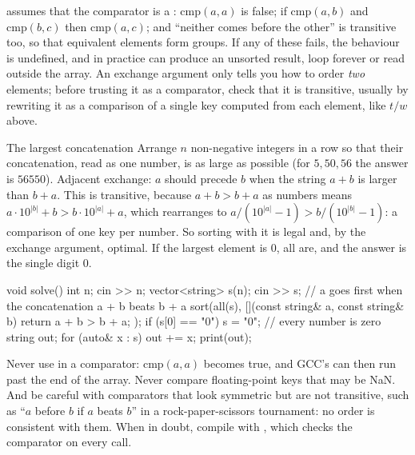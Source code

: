  assumes that the comparator is a : $\mathrm{cmp}(a, a)$ is false; if $\mathrm{cmp}(a,
b)$ and $\mathrm{cmp}(b, c)$ then $\mathrm{cmp}(a, c)$; and ``neither comes before the other'' is transitive too, so that
equivalent elements form groups. If any of these fails, the behaviour is undefined, and in practice  can produce an
unsorted result, loop forever or read outside the array. An exchange argument only tells you how to order \emph{two}
elements; before trusting it as a comparator, check that it is transitive, usually by rewriting it as a comparison of a single
key computed from each element, like $t/w$ above.

\begin{problem}{The largest concatenation}
Arrange $n$ non-negative integers in a row so that their concatenation, read as one number, is as large as possible (for
$5, 50, 56$ the answer is $56550$).
\solution Adjacent exchange: $a$ should precede $b$ when the string $a + b$ is larger than $b + a$. This is transitive,
because $a + b > b + a$ as numbers means $a \cdot 10^{|b|} + b > b \cdot 10^{|a|} + a$, which rearranges to
$a / (10^{|a|} - 1) > b / (10^{|b|} - 1)$: a comparison of one key per number. So sorting with it is legal and, by the
exchange argument, optimal. If the largest element is 0, all are, and the answer is the single digit 0.
\end{problem}

\begin{code}
void solve() {
    int n;
    cin >> n;
    vector<string> s(n);
    cin >> s;
    // a goes first when the concatenation a + b beats b + a
    sort(all(s), [](const string& a, const string& b) {
        return a + b > b + a;
    });
    if (s[0] == "0") s = {"0"};  // every number is zero
    string out;
    for (auto& x : s) out += x;
    print(out);
}
\end{code}

\begin{pitfall}
Never use \cc{<=} in a comparator: $\mathrm{cmp}(a, a)$ becomes true, and GCC's  can then run past the end of the
array. Never compare floating-point keys that may be NaN. And be careful with comparators that look symmetric but are not
transitive, such as ``$a$ before $b$ if $a$ beats $b$'' in a rock-paper-scissors tournament: no order is consistent with
them. When in doubt, compile with , which checks the comparator on every call.
\end{pitfall}

